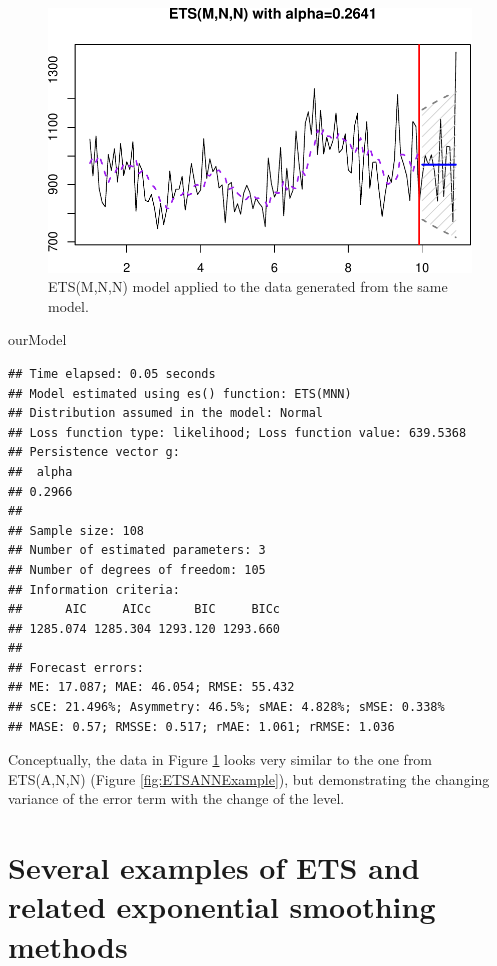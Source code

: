\documentclass[]{book}
\newenvironment{Shaded}{\begin{snugshade}}{\end{snugshade}}
\newcommand{\NormalTok}[1]{#1}
\theoremstyle{definition}
\theoremstyle{definition}
\theoremstyle{definition}
\theoremstyle{definition}
\theoremstyle{remark}
\begin{document}
\begin{figure}
\centering
\includegraphics{Svetunkov--2022----ADAM_files/figure-latex/ETSMNNExample-1.pdf}
\caption{\label{fig:ETSMNNExample}ETS(M,N,N) model applied to the data generated from the same model.}
\end{figure}

\begin{Shaded}
\begin{Highlighting}[]
\NormalTok{ourModel}
\end{Highlighting}
\end{Shaded}

\begin{verbatim}
## Time elapsed: 0.05 seconds
## Model estimated using es() function: ETS(MNN)
## Distribution assumed in the model: Normal
## Loss function type: likelihood; Loss function value: 639.5368
## Persistence vector g:
##  alpha 
## 0.2966 
## 
## Sample size: 108
## Number of estimated parameters: 3
## Number of degrees of freedom: 105
## Information criteria:
##      AIC     AICc      BIC     BICc 
## 1285.074 1285.304 1293.120 1293.660 
## 
## Forecast errors:
## ME: 17.087; MAE: 46.054; RMSE: 55.432
## sCE: 21.496%; Asymmetry: 46.5%; sMAE: 4.828%; sMSE: 0.338%
## MASE: 0.57; RMSSE: 0.517; rMAE: 1.061; rRMSE: 1.036
\end{verbatim}

Conceptually, the data in Figure \ref{fig:ETSMNNExample} looks very similar to the one from ETS(A,N,N) (Figure \ref{fig:ETSANNExample}), but demonstrating the changing variance of the error term with the change of the level.

\hypertarget{ETSExamples}{%
\section{Several examples of ETS and related exponential smoothing methods}\label{ETSExamples}}
\end{document}

